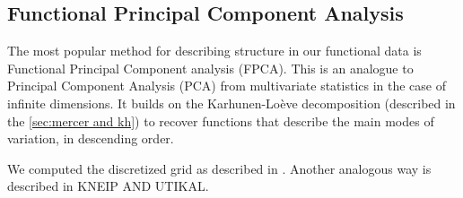 \subsection{Functional Principal Component Analysis}
\label{sec:fpca}
The most popular method for describing structure in our functional data is Functional
Principal Component analysis (FPCA). This is an analogue to Principal Component Analysis
(PCA) from multivariate statistics in the case of infinite dimensions. It builds on the
Karhunen-Loève decomposition (described in the \ref{sec:mercer and kh}) to recover functions
that describe the main modes of variation, in descending order.

We computed the discretized grid as described in \citet[Chapter~8.4.1]{RamsaySilverman2005}. Another analogous way
is described in KNEIP AND UTIKAL.
